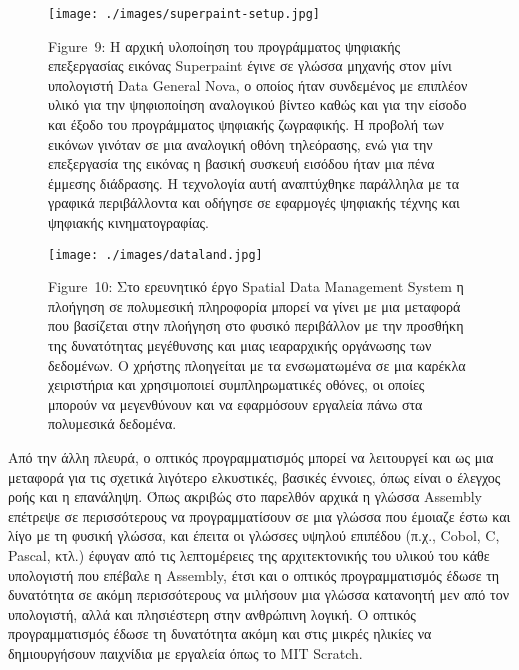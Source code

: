 \documentclass[
]{article}
\begin{document}
\leavevmode{}%
\begin{figure}
\hypertarget{fig:superpaint-setup}{%
\centering
\texttt{[image: ./images/superpaint-setup.jpg]}
\caption{Figure~9: Η αρχική υλοποίηση του προγράμματος ψηφιακής
επεξεργασίας εικόνας Superpaint έγινε σε γλώσσα μηχανής στον μίνι
υπολογιστή Data General Nova, ο οποίος ήταν συνδεμένος με επιπλέον υλικό
για την ψηφιοποίηση αναλογικού βίντεο καθώς και για την είσοδο και έξοδο
του προγράμματος ψηφιακής ζωγραφικής. Η προβολή των εικόνων γινόταν σε
μια αναλογική οθόνη τηλεόρασης, ενώ για την επεξεργασία της εικόνας η
βασική συσκευή εισόδου ήταν μια πένα έμμεσης διάδρασης. Η τεχνολογία
αυτή αναπτύχθηκε παράλληλα με τα γραφικά περιβάλλοντα και οδήγησε σε
εφαρμογές ψηφιακής τέχνης και ψηφιακής
κινηματογραφίας.}\label{fig:superpaint-setup}
}
\end{figure}

\leavevmode{}%
\begin{figure}
\hypertarget{fig:dataland}{%
\centering
\texttt{[image: ./images/dataland.jpg]}
\caption{Figure~10: Στο ερευνητικό έργο Spatial Data Management System η
πλοήγηση σε πολυμεσική πληροφορία μπορεί να γίνει με μια μεταφορά που
βασίζεται στην πλοήγηση στο φυσικό περιβάλλον με την προσθήκη της
δυνατότητας μεγέθυνσης και μιας ιεαραρχικής οργάνωσης των δεδομένων. Ο
χρήστης πλοηγείται με τα ενσωματωμένα σε μια καρέκλα χειριστήρια και
χρησιμοποιεί συμπληρωματικές οθόνες, οι οποίες μπορούν να μεγενθύνουν
και να εφαρμόσουν εργαλεία πάνω στα πολυμεσικά
δεδομένα.}\label{fig:dataland}
}
\end{figure}

Από την άλλη πλευρά, ο οπτικός προγραμματισμός μπορεί να λειτουργεί και
ως μια μεταφορά για τις σχετικά λιγότερο ελκυστικές, βασικές έννοιες,
όπως είναι ο έλεγχος ροής και η επανάληψη. Όπως ακριβώς στο παρελθόν
αρχικά η γλώσσα Assembly επέτρεψε σε περισσότερους να προγραμματίσουν σε
μια γλώσσα που έμοιαζε έστω και λίγο με τη φυσική γλώσσα, και έπειτα οι
γλώσσες υψηλού επιπέδου (π.χ., Cobol, C, Pascal, κτλ.) έφυγαν από τις
λεπτομέρειες της αρχιτεκτονικής του υλικού του κάθε υπολογιστή που
επέβαλε η Assembly, έτσι και ο οπτικός προγραμματισμός έδωσε τη
δυνατότητα σε ακόμη περισσότερους να μιλήσουν μια γλώσσα κατανοητή μεν
από τον υπολογιστή, αλλά και πλησιέστερη στην ανθρώπινη λογική. Ο
οπτικός προγραμματισμός έδωσε τη δυνατότητα ακόμη και στις μικρές
ηλικίες να δημιουργήσουν παιχνίδια με εργαλεία όπως το MIT Scratch.
\end{document}
